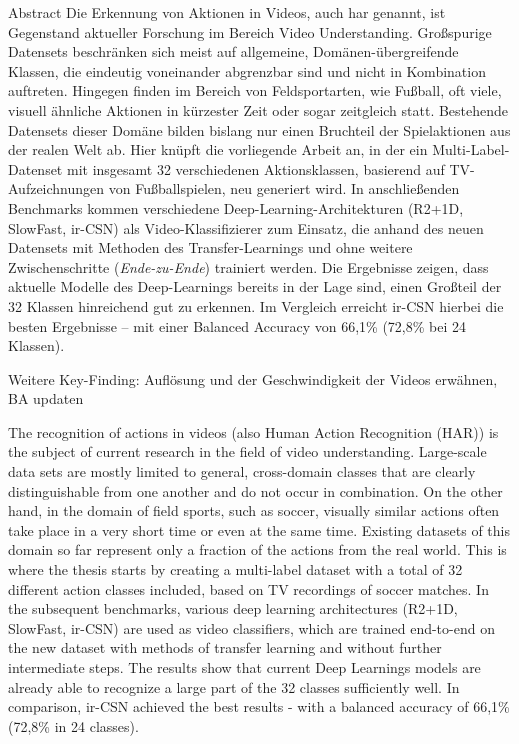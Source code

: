 \newcommand{\primarymetric}{66,1}
\newcommand{\secondarymetric}{72,8}

\begin{prefacesection}{Abstract}
    Die Erkennung von Aktionen in Videos, auch \gls{har} genannt, ist Gegenstand aktueller Forschung im Bereich Video Understanding.
    Großspurige Datensets beschränken sich meist auf allgemeine, Domänen-übergreifende Klassen, die eindeutig voneinander abgrenzbar sind und nicht in Kombination auftreten.
    Hingegen finden im Bereich von Feldsportarten, wie Fußball, oft viele, visuell ähnliche Aktionen in kürzester Zeit oder sogar zeitgleich statt.
    Bestehende Datensets dieser Domäne bilden bislang nur einen Bruchteil der Spielaktionen aus der realen Welt ab.
    Hier knüpft die vorliegende Arbeit an, in der ein Multi-Label-Datenset mit insgesamt 32 verschiedenen Aktionsklassen, basierend auf TV-Aufzeichnungen von Fußballspielen, neu generiert wird.
    In anschließenden Benchmarks kommen verschiedene Deep-Learning-Architekturen (R2+1D, SlowFast, ir-CSN) als Video-Klassifizierer zum Einsatz, die anhand des neuen Datensets mit Methoden des Transfer-Learnings und ohne weitere Zwischenschritte (\emph{Ende-zu-Ende}) trainiert werden.
    Die Ergebnisse zeigen, dass aktuelle Modelle des Deep-Learnings bereits in der Lage sind, einen Großteil der 32 Klassen hinreichend gut zu erkennen.
    Im Vergleich erreicht ir-CSN hierbei die besten Ergebnisse -- mit einer Balanced Accuracy von \primarymetric \% (\secondarymetric \% bei 24 Klassen).

    \begin{tcolorbox}[title=WIP]
        Weitere Key-Finding: Auflösung und der Geschwindigkeit der Videos erwähnen, BA updaten
    \end{tcolorbox}


    The recognition of actions in videos (also Human Action Recognition (HAR)) is the subject of current research in the field of video understanding.
    Large-scale data sets are mostly limited to general, cross-domain classes that are clearly distinguishable from one another and do not occur in combination.
    On the other hand, in the domain of field sports, such as soccer, visually similar actions often take place in a very short time or even at the same time.
    Existing datasets of this domain so far represent only a fraction of the actions from the real world.
    This is where the thesis starts by creating a multi-label dataset with a total of 32 different action classes included, based on TV recordings of soccer matches.
    In the subsequent benchmarks, various deep learning architectures (R2+1D, SlowFast, ir-CSN) are used as video classifiers, which are trained end-to-end on the new dataset with methods of transfer learning and without further intermediate steps.
    The results show that current Deep Learnings models are already able to recognize a large part of the 32 classes sufficiently well.
    In comparison, ir-CSN achieved the best results - with a balanced accuracy of \primarymetric \% (\secondarymetric \% in 24 classes).

\end{prefacesection}